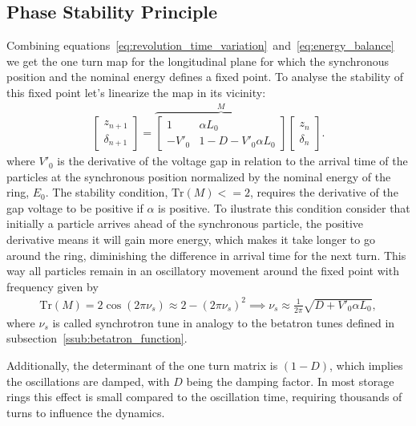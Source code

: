 	\subsection{Phase Stability Principle}

	Combining equations~\eqref{eq:revolution_time_variation}~and~\eqref{eq:energy_balance} we get the one turn map for the longitudinal plane for which the synchronous position and the nominal energy defines a fixed point. To analyse the stability of this fixed point let's linearize the map in its vicinity:
	\begin{align}
		\begin{bmatrix} z_{n+1} \\ \delta_{n+1}\end{bmatrix} = \overbrace{
			\begin{bmatrix} 1 & \alpha L_0 \\ -V'_0 & 1-D - V'_0\alpha L_0 \end{bmatrix}
		}^M \begin{bmatrix} z_n \\ \delta_n \end{bmatrix}.
	\end{align}
	where $V'_0$ is the derivative of the voltage gap in relation to the arrival time of the particles at the synchronous position normalized by the nominal energy of the ring, $E_0$. The stability condition, $\text{Tr}(M) <= 2$, requires the derivative of the gap voltage to be positive if $\alpha$ is positive. To ilustrate this condition consider that initially a particle arrives ahead of the synchronous particle, the positive derivative means it will gain more energy, which makes it take longer to go around the ring, diminishing the difference in arrival time for the next turn. This way all particles remain in an oscillatory movement around the fixed point with frequency given by
	\begin{align}
		\text{Tr}(M) = 2\cos(2\pi\nu_s) \approx 2-(2\pi\nu_s)^2 \implies
		\nu_s \approx \frac{1}{2\pi}\sqrt{D+V'_0\alpha L_0},
	\end{align}
	where $\nu_s$ is called synchrotron tune in analogy to the betatron tunes defined in subsection~\ref{ssub:betatron_function}.

	Additionally, the determinant of the one turn matrix is $(1-D)$, which implies the oscillations are damped, with $D$ being the damping factor. In most storage rings this effect is small compared to the oscillation time, requiring thousands of turns to influence the dynamics.


